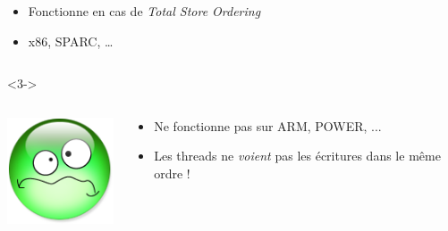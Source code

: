 \documentclass[xcolor={x11names,svgnames}]{beamer}
\begin{document}
\begin{frame}[fragile, label=tso_mp]
\begin{overlayarea}{\textwidth}{1cm}
\begin{onlyenv}
\begin{columns}[c]
        \begin{column}{.9\textwidth}
          \begin{itemize}        \small
          \item Fonctionne en cas de  \emph{Total Store Ordering}
          \item x86, SPARC, \dots
          \end{itemize}
        \end{column}
      \end{columns}
    \end{onlyenv}
    
    \begin{onlyenv}<3->  
      \begin{columns}[c]
        \begin{column}{.1\textwidth}
          \vspace{3mm}
          \includegraphics[width=\textwidth]{triste.png}
        \end{column}
        
        \begin{column}{.9\textwidth}
          \begin{itemize}        \small
          \item Ne fonctionne pas sur ARM, POWER, ...
          \item Les threads ne \emph{voient} pas les écritures dans le même ordre !
          \end{itemize}
        \end{column}
      \end{columns}  
    \end{onlyenv}
  \end{overlayarea}
  

\end{frame}
\end{document}
